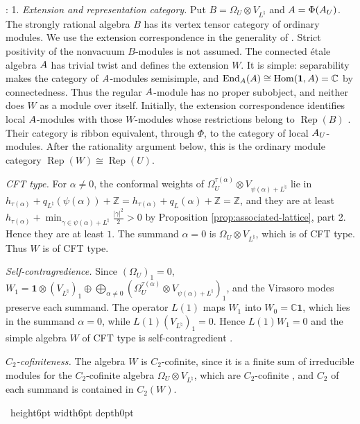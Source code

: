 \documentclass[leqno]{article}
\newcommand{\Cbb}{\ensuremath{\mathbb{C}}}
\let\cal\relax
\newcommand{\cal}{\mathcal}
\newcommand{\Z}{\ensuremath{\mathbb{Z}}}
\newcommand{\qed}{\hfill \vrule height6pt  width6pt depth0pt}
\newcommand{\ot}{\otimes}
\DeclareMathOperator{\Rep}{Rep}
\newenvironment{proof}[1][]{\noindent {\it Proof #1} : }{\hbox{~}\qed
\smallskip
}
\numberwithin{equation}{section}
\begin{document}
\begin{proof}
1. \emph{Extension and representation category.} Put $B = \Omega_U \ot V_{L^\natural}$ and $\cal A = \Phi(\cal A_U)$. The strongly rational algebra $B$ has its vertex tensor category of ordinary modules. We use the extension correspondence in the generality of \cite[Theorem 3.2 and Remark 3.3]{HKL15}. Strict positivity of the nonvacuum $B$-modules is not assumed. The connected étale algebra $\cal A$ has trivial twist and defines the extension $W$. It is simple: separability makes the category of $\cal A$-modules semisimple, and $\operatorname{End}_{\cal A}(\cal A) \cong \operatorname{Hom}(\mathbf 1,\cal A) = \Cbb$ by connectedness. Thus the regular $\cal A$-module has no proper subobject, and neither does $W$ as a module over itself. Initially, the extension correspondence identifies local $\cal A$-modules with those $W$-modules whose restrictions belong to $\Rep(B)$ \cite{HKL15,CKM22}. Their category is ribbon equivalent, through $\Phi$, to the category of local $\cal A_U$-modules. After the rationality argument below, this is the ordinary module category $\Rep(W) \cong \Rep(U)$.

\emph{CFT type.} For $\alpha \neq 0$, the conformal weights of $\Omega_U^{\tau(\alpha)} \ot V_{\psi(\alpha)+L^\natural}$ lie in $h_{\tau(\alpha)}+q_{L^\natural}(\psi(\alpha))+\Z = h_{\tau(\alpha)}+q_L(\alpha)+\Z = \Z$, and they are at least $h_{\tau(\alpha)}+\min_{\gamma \in \psi(\alpha)+L^\natural}\frac{|\gamma|^2}2 > 0$ by Proposition \ref{prop:associated-lattice}, part 2. Hence they are at least $1$. The summand $\alpha = 0$ is $\Omega_U \ot V_{L^\natural}$, which is of CFT type. Thus $W$ is of CFT type.

\emph{Self-contragredience.} Since $(\Omega_U)_1 = 0$, $W_1 = \mathbf 1 \ot (V_{L^\natural})_1 \oplus \bigoplus_{\alpha \neq 0}(\Omega_U^{\tau(\alpha)} \ot V_{\psi(\alpha)+L^\natural})_1$, and the Virasoro modes preserve each summand. The operator $L(1)$ maps $W_1$ into $W_0 = \Cbb\mathbf 1$, which lies in the summand $\alpha = 0$, while $L(1)(V_{L^\natural})_1 = 0$. Hence $L(1)W_1 = 0$ and the simple algebra $W$ of CFT type is self-contragredient \cite{Li94}.

\emph{$C_2$-cofiniteness.} The algebra $W$ is $C_2$-cofinite, since it is a finite sum of irreducible modules for the $C_2$-cofinite algebra $\Omega_U \ot V_{L^\natural}$, which are $C_2$-cofinite \cite{Buh02}, and $C_2$ of each summand is contained in $C_2(W)$.


\end{proof}
\end{document}
